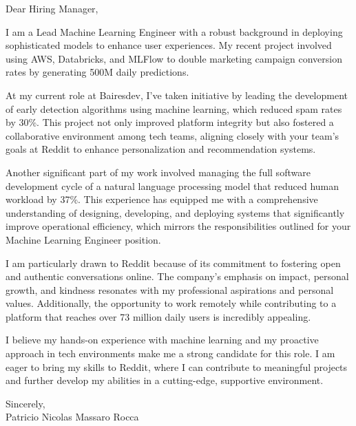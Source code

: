 \documentclass{article}
\begin{document}
\noindent Dear Hiring Manager,


I am a Lead Machine Learning Engineer with a robust background in deploying sophisticated models to enhance user experiences. My recent project involved using AWS, Databricks, and MLFlow to double marketing campaign conversion rates by generating 500M daily predictions.


At my current role at Bairesdev, I've taken initiative by leading the development of early detection algorithms using machine learning, which reduced spam rates by 30\%. This project not only improved platform integrity but also fostered a collaborative environment among tech teams, aligning closely with your team's goals at Reddit to enhance personalization and recommendation systems.


Another significant part of my work involved managing the full software development cycle of a natural language processing model that reduced human workload by 37\%. This experience has equipped me with a comprehensive understanding of designing, developing, and deploying systems that significantly improve operational efficiency, which mirrors the responsibilities outlined for your Machine Learning Engineer position.


I am particularly drawn to Reddit because of its commitment to fostering open and authentic conversations online. The company's emphasis on impact, personal growth, and kindness resonates with my professional aspirations and personal values. Additionally, the opportunity to work remotely while contributing to a platform that reaches over 73 million daily users is incredibly appealing.


I believe my hands-on experience with machine learning and my proactive approach in tech environments make me a strong candidate for this role. I am eager to bring my skills to Reddit, where I can contribute to meaningful projects and further develop my abilities in a cutting-edge, supportive environment.

\vspace{1cm}
\setlength{\parskip}{0em}
\begin{flushright}
Sincerely,\\
Patricio Nicolas Massaro Rocca
\end{flushright}
\end{document}
